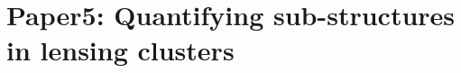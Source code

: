\chapter{Paper5: Quantifying sub-structures in lensing clusters}\label{paper:substructures}



\clearpage
